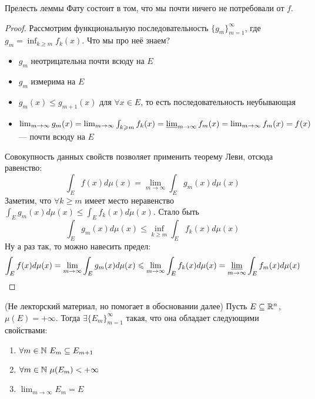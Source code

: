 \begin{note}
	Прелесть леммы Фату состоит в том, что мы почти ничего не потребовали от $f$.
\end{note}

\begin{proof}
	Рассмотрим функциональную последовательность $\{g_m\}_{m = 1}^\infty$, где $g_m = \inf_{k \ge m} f_k(x)$. Что мы про неё знаем?
	\begin{itemize}
		\item $g_m$ неотрицательна почти всюду на $E$
		
		\item $g_m$ измерима на $E$
		
		\item $g_m(x) \le g_{m + 1}(x)$ для $\forall x \in E$, то есть последовательность неубывающая
		
		\item $\lim_{m \to \infty} g_m(x) = \lim_{m \to \infty} \int_{k \ge m} f_k(x) = \varliminf_{m \to \infty} f_m(x) = \lim_{m \to \infty} f_m(x) = f(x)$ --- почти всюду на $E$
	\end{itemize}
	Совокупность данных свойств позволяет применить теорему Леви, отсюда равенство:
	\[
		\int_E f(x)d\mu(x) = \lim_{m \to \infty} \int_E g_m(x)d\mu(x)
	\]
	Заметим, что $\forall k \ge m$ имеет место неравенство $\int_E g_m(x)d\mu(x) \le \int_E f_k(x)d\mu(x)$. Стало быть
	\[
		\int_E g_m(x)d\mu(x) \le \inf_{k \ge m} \int_E f_k(x)d\mu(x)
	\]
	Ну а раз так, то можно навесить предел:
	\[
		\int_E f(x)d\mu(x) = \lim_{m \to \infty} \int_E g_m(x)d\mu(x) \le \lim_{m \to \infty} \int_E f_k(x)d\mu(x) = \varliminf_{m \to \infty} \int_E f_m(x)d\mu(x)
	\]
\end{proof}

\begin{proposition} (Не лекторский материал, но помогает в обосновании далее)
	Пусть $E \subseteq \R^n$, $\mu(E) = +\infty$. Тогда $\exists \{E_m\}_{m = 1}^\infty$ такая, что она обладает следующими свойствами:
	\begin{enumerate}
		\item $\forall m \in \N\ E_m \subseteq E_{m + 1}$
		
		\item $\forall m \in \N\ \mu(E_m) < +\infty$
		
		\item $\lim_{m \to \infty} E_m = E$
	\end{enumerate}
\end{proposition}

